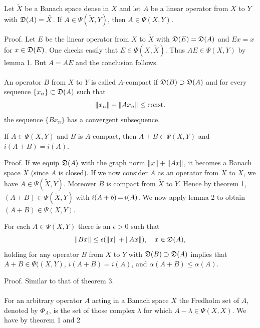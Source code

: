 \documentclass[11pt,twoside]{article}
\begin{document}
\begin{lemma} %
Let $\tilde{X}$ be a Banach space dense in $X$
and let $A$ be a linear operator from $X$ to $Y$
with $\mathfrak{D}(A) = \tilde{X}$.
If $A \in \Psi(\tilde{X},Y)$, then $A \in \Psi(X,Y)$.
\end{lemma}

Proof.
Let $E$ be the linear operator from $X$ to $\tilde{X}$ with
$\mathfrak{D}(E) = \mathfrak{D}(A)$ and $Ex = x$ for $x \in \mathfrak{D}(E)$.
One checks easily that $E \in \Psi(X,\tilde{X})$.
Thus $AE \in \Psi(X,Y)$ by lemma 1.
But $A = AE$ and the conclusion follows.

\paragraph*{}
An operator $B$ from $X$ to $Y$ is called $A$-compact
if
$\mathfrak{D}(B) \supset \mathfrak{D}(A)$ and
for every sequence $\{x_n\} \subset \mathfrak{D}(A)$ such that
\[
\left\lVert x_n \right\rVert + \left\lVert Ax_n \right\rVert \leq \mbox{const.}
\]
the sequence $\{Bx_n\}$ has a convergent subsequence.

\begin{theorem1} %
If $A \in \Psi(X,Y)$ and $B$ is $A$-compact,
then $A+B \in \Psi(X,Y)$ and $i(A+B) = i(A)$.
\end{theorem1}

Proof.
If we equip $\mathfrak{D}(A)$ with the graph norm $\left\lVert x \right\rVert+\left\lVert Ax \right\rVert$,
it becomes a Banach space $\tilde{X}$ (since $A$ is closed).
If we now consider $A$ as an operator from $\tilde{X}$ to $X$,
we have $A \in \Psi(\tilde{X},Y)$.
Moreover $B$ is compact from $\tilde{X}$ to $Y$.
Hence by theorem 1, $(A+B) \in \Psi(\tilde{X},Y)$ with
$i(A+b) {\,=\,} i(A)$.
We now apply lemma 2 to obtain $(A+B) \in \Psi(X,Y)$.

\begin{theorem1} %
For each $A \in \Psi(X,Y)$ there is an $\epsilon > 0$
such that
\[
\left\lVert B x \right\rVert \leq \epsilon (\left\lVert x \right\rVert + \left\lVert A x \right\rVert), \quad x \in \mathfrak{D}(A),
\]
holding for any operator $B$ from $X$ to $Y$
with $\mathfrak{D}(B) \supset \mathfrak{D}(A)$
implies that
$A+B \in \Psi((X,Y)$, $i(A+B) = i(A)$,
and $\alpha(A + B) \leq \alpha(A)$.
\end{theorem1}

Proof.
Similar to that of theorem 3.

\paragraph*{}
For an arbitrary operator $A$ acting in a Banach space $X$
the Fredholm set of $A$,
denoted by $\Phi_A$,
is the set of those complex $\lambda$
for which $A-\lambda \in \Psi(X,X)$.
We have by theorem 1 and 2
\end{document}
